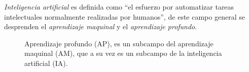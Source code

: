 \emph{Inteligencia artificial} es definida como ``el esfuerzo por automatizar tareas intelectuales normalmente realizadas por humanos''\cite{cho18}, de este campo general se desprenden el \emph{aprendizaje maquinal} y el \emph{aprendizaje profundo}.

\begin{figure}[H]\centering
{}
\caption{Aprendizaje profundo (AP), es un subcampo del aprendizaje maquinal (AM), que a su vez es un subcampo de la inteligencia artificial (IA)\cite{cho18}.}\label{fig:AI}
\end{figure}